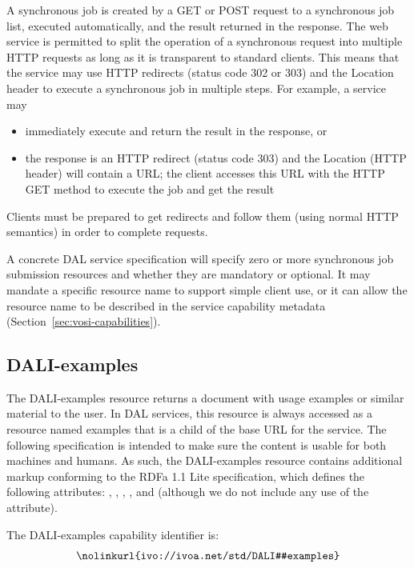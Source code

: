\documentclass[11pt,letter]{ivoa}
\begin{document}
A synchronous job is created by a GET or POST request to a synchronous job list,
executed automatically, and the result returned in the response. The web service
is permitted to split the operation of a synchronous request into multiple HTTP
requests as long as it is transparent to standard clients. This means that the
service may use HTTP redirects (status code 302 or 303) and the Location header
to execute a synchronous job in multiple steps. For example, a service may

\begin{itemize}
\item immediately execute and return the result in the response, or
\item the response is an HTTP redirect (status code 303) and the Location (HTTP
header) will contain a URL; the client accesses this URL with the HTTP GET
method to execute the job and get the result
\end{itemize}

Clients must be prepared to get redirects and follow them (using normal HTTP
semantics) in order to complete requests.

A concrete DAL service specification will specify zero or more synchronous job
submission resources and whether they are mandatory or optional. It may mandate
a specific resource name to support simple client use, or it can allow the
resource name to be described in the service capability metadata 
(Section~\ref{sec:vosi-capabilities}).

\subsection{DALI-examples}
\label{sec:dali-examples}
The DALI-examples resource returns a document with usage examples or similar
material to the user. In DAL services, this resource is always accessed as a
resource named examples that is a child of the base URL for the service. The
following specification is intended to make sure the content is usable for both
machines and humans. As such, the DALI-examples resource contains additional
markup conforming to the RDFa 1.1 Lite \citep{std:RDFaLite11} specification,
which defines the
following attributes: , , ,
, and  (although we
do not include any use of the  attribute).

The DALI-examples capability identifier is:
$$
\hbox{\nolinkurl{ivo://ivoa.net/std/DALI#examples}}
$$
\end{document}
